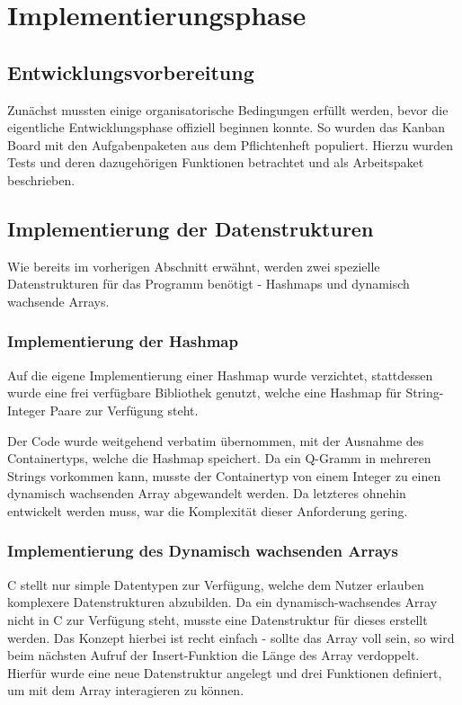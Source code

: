 \section{Implementierungsphase}
\label{section:implementierungsphase}
\subsection{Entwicklungsvorbereitung}
Zunächst mussten einige organisatorische Bedingungen erfüllt werden, bevor die eigentliche Entwicklungsphase offiziell beginnen konnte. So wurden das Kanban Board mit den
Aufgabenpaketen aus dem Pflichtenheft populiert. Hierzu wurden Tests und deren
dazugehörigen Funktionen betrachtet und als Arbeitspaket beschrieben.

\subsection{Implementierung der Datenstrukturen}
Wie bereits im vorherigen Abschnitt erwähnt, werden zwei spezielle Datenstrukturen für das Programm benötigt - Hashmaps und dynamisch wachsende Arrays.

\subsubsection{Implementierung der Hashmap}


Auf die eigene Implementierung einer Hashmap wurde verzichtet, stattdessen wurde
eine frei verfügbare Bibliothek genutzt, welche eine Hashmap für
String-Integer Paare zur Verfügung steht.

Der Code wurde weitgehend verbatim übernommen, mit der Ausnahme des
Containertyps, welche die Hashmap speichert. Da ein Q-Gramm in mehreren Strings
vorkommen kann, musste der Containertyp von einem Integer zu einen dynamisch
wachsenden Array abgewandelt werden. Da letzteres ohnehin entwickelt werden muss,
war die Komplexität dieser Anforderung gering.

\subsubsection{Implementierung des Dynamisch wachsenden Arrays}
C stellt nur simple Datentypen zur Verfügung, welche dem Nutzer erlauben komplexere
Datenstrukturen abzubilden. Da ein dynamisch-wachsendes
Array nicht in C zur Verfügung steht, musste eine Datenstruktur für dieses erstellt werden.
Das Konzept hierbei ist recht einfach - sollte das Array voll sein, so wird beim
nächsten Aufruf der Insert-Funktion die Länge des Array verdoppelt. Hierfür wurde
eine neue Datenstruktur angelegt und drei Funktionen definiert, um mit dem Array
interagieren zu können.\par
